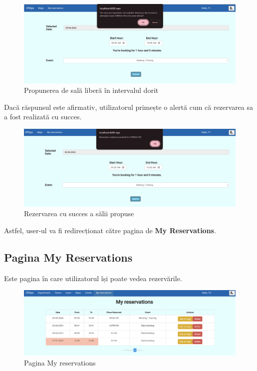 \begin{figure}[!htb]
    \centering
    \includegraphics[width=0.9\linewidth]{images/sicily rezerv2.png}
    \caption{Propunerea de sală liberă în intervalul dorit}
    \label{fig:sicily rezerv2.png}
\end{figure}

Dacă răspunsul este afirmativ, utilizatorul primește o alertă cum că rezervarea sa a fost realizată cu succes.

\begin{figure}[!htb]
    \centering
    \includegraphics[width=0.9\linewidth]{images/sicily rezerv3.png}
    \caption{Rezervarea cu succes a sălii propuse}
    \label{fig:sicily rezerv3.png}
\end{figure}

Astfel, user-ul va fi redirecționat către pagina de 
\textbf{My Reservations}.

\subsection{Pagina My Reservations}

Este pagina în care utilizatorul își poate vedea rezervările.

\begin{figure}[!htb]
    \centering
    \includegraphics[width=0.9\linewidth]{images/myres.png}
    \caption{Pagina My reservations}
    \label{fig:myres}
\end{figure}

